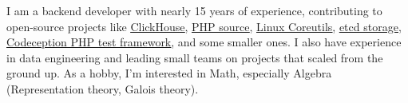 I am a backend developer with nearly 15 years of experience, contributing to
open-source projects like
\href{https://github.com/ClickHouse/ClickHouse/pulls?q=is\%3Apr+is\%3Aclosed+author\%3AGSokol}{\underline{ClickHouse}},
\href{https://github.com/php/php-src/pulls?q=is\%3Apr+is\%3Aclosed+author\%3AGSokol}{\underline{PHP source}},
\href{https://github.com/coreutils/coreutils/commits?author=GSokol}{\underline{Linux Coreutils}},
\href{https://github.com/etcd-io/etcd/pulls?q=is\%3Apr+is\%3Aclosed+author\%3AGSokol}{\underline{etcd storage}},
\href{https://github.com/Codeception/Codeception/pulls?q=is\%3Apr+is\%3Aclosed+author\%3AGSokol}{\underline{Codeception PHP test framework}},
and some smaller ones. I also have experience in data engineering and leading
small teams on projects that scaled from the ground up. As a hobby, I'm
interested in Math, especially Algebra (Representation theory, Galois theory).
